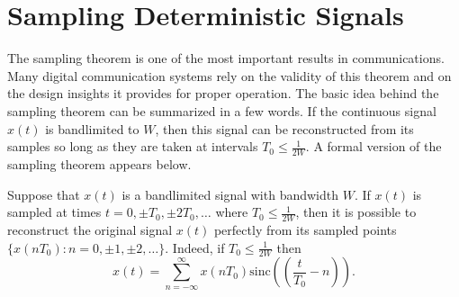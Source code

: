 \section{Sampling Deterministic Signals}

The sampling theorem is one of the most important results in communications.
Many digital communication systems rely on the validity of this theorem and on the design insights it provides for proper operation.
The basic idea behind the sampling theorem can be summarized in a few words.
If the continuous signal $x(t)$ is bandlimited to $W$, then this signal can be reconstructed from its samples so long as they are taken at intervals $T_0 \leq \frac{1}{2W}$.
A formal version of the sampling theorem appears below.

\begin{theorem} \label{theorem:SamplingTheorem}
Suppose that $x(t)$ is a bandlimited signal with bandwidth $W$.
If $x(t)$ is sampled at times $t = 0, \pm T_0, \pm 2T_0, \ldots$ where $T_0 \leq \frac{1}{2W}$, then it is possible to reconstruct the original signal $x(t)$ perfectly from its sampled points $\{ x(nT_0) : n = 0, \pm 1, \pm 2, \ldots \}$.
Indeed, if $T_0 \leq \frac{1}{2W}$ then
\begin{equation*}
x(t) = \sum_{n = -\infty}^{\infty}
x(nT_0) \mathrm{sinc} \left( \left( \frac{t}{T_0}-n \right) \right) .
\end{equation*}
\end{theorem}
